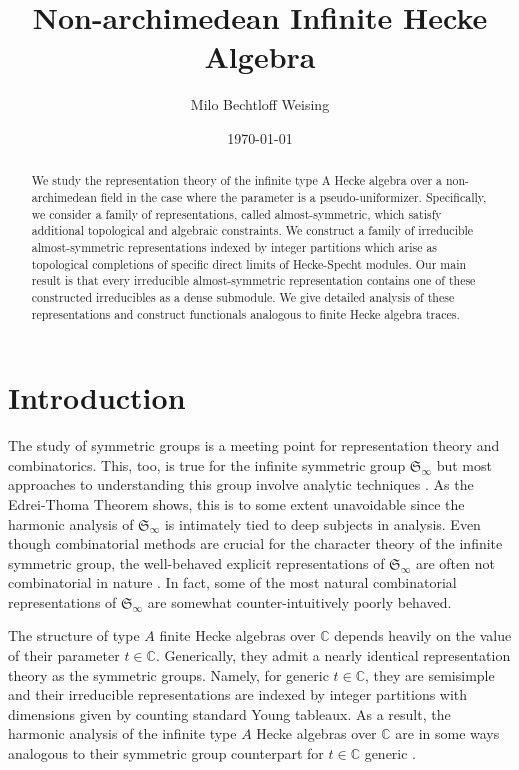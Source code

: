 \documentclass[12pt,reqno]{amsart}
\title{Non-archimedean Infinite Hecke Algebra}
\author{Milo Bechtloff Weising}
\date{\today}
\theoremstyle{definition}
\begin{document}
\maketitle 

\begin{abstract}
    We study the representation theory of the infinite type A Hecke algebra over a non-archimedean field in the case where the parameter is a pseudo-uniformizer. Specifically, we consider a family of representations, called almost-symmetric, which satisfy additional topological and algebraic constraints. We construct a family of irreducible almost-symmetric representations indexed by integer partitions which arise as topological completions of specific direct limits of Hecke-Specht modules. Our main result is that every irreducible almost-symmetric representation contains one of these constructed irreducibles as a dense submodule. We give detailed analysis of these representations and construct functionals analogous to finite Hecke algebra traces. 
\end{abstract}

\tableofcontents

\section{Introduction}

The study of symmetric groups is a meeting point for representation theory and combinatorics. This, too, is true for the infinite symmetric group $\mathfrak{S}_{\infty}$ but most approaches to understanding this group involve analytic techniques \cite{BO16}. As the Edrei-Thoma Theorem shows, this is to some extent unavoidable since the harmonic analysis of $\mathfrak{S}_{\infty}$ is intimately tied to deep subjects in analysis. Even though combinatorial methods are crucial for the character theory of the infinite symmetric group, the well-behaved explicit representations of $\mathfrak{S}_{\infty}$ are often not combinatorial in nature \cite{Okounkov97} \cite{Olshanski03}. In fact, some of the most natural combinatorial representations of $\mathfrak{S}_{\infty}$ are somewhat counter-intuitively poorly behaved.

The structure of type $A$ finite Hecke algebras over $\mathbb{C}$ depends heavily on the value of their parameter $t \in \mathbb{C}.$ Generically, they admit a nearly identical representation theory as the symmetric groups. Namely, for generic $t \in \mathbb{C}$, they are semisimple and their irreducible representations are indexed by integer partitions with dimensions given by counting standard Young tableaux. As a result, the harmonic analysis of the infinite type $A$ Hecke algebras over $\mathbb{C}$ are in some ways analogous to their symmetric group counterpart for $t \in \mathbb{C}$ generic \cite{VK98} \cite{GKV14}.
\end{document}
